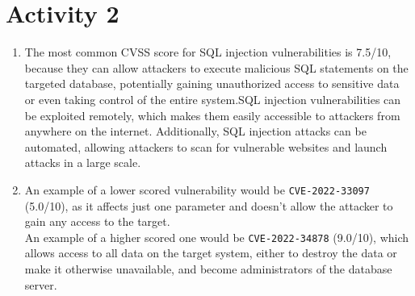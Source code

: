 \section*{Activity 2}
\begin{enumerate}
    \item The most common CVSS score for SQL injection vulnerabilities is 7.5/10, because they can allow attackers to execute malicious SQL statements on the targeted database, potentially gaining unauthorized access to sensitive data or even taking control of the entire system.SQL injection vulnerabilities can be exploited remotely, which makes them easily accessible to attackers from anywhere on the internet. Additionally, SQL injection attacks can be automated, allowing attackers to scan for vulnerable websites and launch attacks in a large scale. 
    \item An example of a lower scored vulnerability would be \texttt{CVE-2022-33097} (5.0/10), as it affects just one parameter and doesn't allow the attacker to gain any access to the target.\\
    An example of a higher scored one would be \texttt{CVE-2022-34878} (9.0/10), which allows access to all data on the target system, either to destroy the data or make it otherwise unavailable, and become administrators of the database server.
\end{enumerate}

